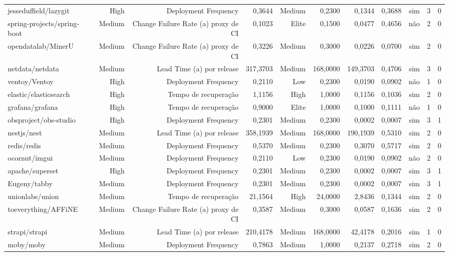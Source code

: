 \begin{tabular}{lrrrrrrrrrr}
jesseduffield/lazygit & High & Deployment Frequency & 0,3644 & Medium & 0,2300 & 0,1344 & 0,3688 & sim & 3 & 0 \\
spring-projects/spring-boot & Medium & Change Failure Rate (a) proxy de CI & 0,1023 & Elite & 0,1500 & 0,0477 & 0,4656 & não & 2 & 0 \\
opendatalab/MinerU & Medium & Change Failure Rate (a) proxy de CI & 0,3226 & Medium & 0,3000 & 0,0226 & 0,0700 & sim & 2 & 0 \\
netdata/netdata & Medium & Lead Time (a) por release & 317,3703 & Medium & 168,0000 & 149,3703 & 0,4706 & sim & 3 & 0 \\
ventoy/Ventoy & High & Deployment Frequency & 0,2110 & Low & 0,2300 & 0,0190 & 0,0902 & não & 1 & 0 \\
elastic/elasticsearch & High & Tempo de recuperação & 1,1156 & High & 1,0000 & 0,1156 & 0,1036 & sim & 2 & 0 \\
grafana/grafana & High & Tempo de recuperação & 0,9000 & Elite & 1,0000 & 0,1000 & 0,1111 & não & 1 & 0 \\
obsproject/obs-studio & High & Deployment Frequency & 0,2301 & Medium & 0,2300 & 0,0002 & 0,0007 & sim & 3 & 1 \\
nestjs/nest & Medium & Lead Time (a) por release & 358,1939 & Medium & 168,0000 & 190,1939 & 0,5310 & sim & 2 & 0 \\
redis/redis & Medium & Deployment Frequency & 0,5370 & Medium & 0,2300 & 0,3070 & 0,5717 & sim & 2 & 0 \\
ocornut/imgui & Medium & Deployment Frequency & 0,2110 & Low & 0,2300 & 0,0190 & 0,0902 & não & 2 & 0 \\
apache/superset & High & Deployment Frequency & 0,2301 & Medium & 0,2300 & 0,0002 & 0,0007 & sim & 3 & 1 \\
Eugeny/tabby & Medium & Deployment Frequency & 0,2301 & Medium & 0,2300 & 0,0002 & 0,0007 & sim & 3 & 1 \\
unionlabs/union & Medium & Tempo de recuperação & 21,1564 & High & 24,0000 & 2,8436 & 0,1344 & sim & 2 & 0 \\
toeverything/AFFiNE & Medium & Change Failure Rate (a) proxy de CI & 0,3587 & Medium & 0,3000 & 0,0587 & 0,1636 & sim & 2 & 0 \\
strapi/strapi & Medium & Lead Time (a) por release & 210,4178 & Medium & 168,0000 & 42,4178 & 0,2016 & sim & 1 & 0 \\
moby/moby & Medium & Deployment Frequency & 0,7863 & Medium & 1,0000 & 0,2137 & 0,2718 & sim & 2 & 0 \\

\end{tabular}
